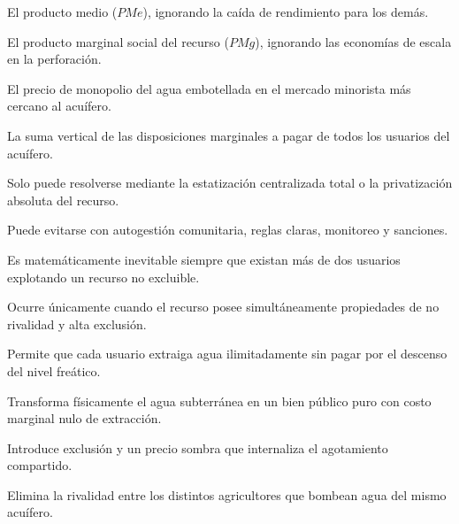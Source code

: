 \begin{opts}
    \item El producto medio ($PMe$), ignorando la caída de rendimiento para los demás.
    \item El producto marginal social del recurso ($PMg$), ignorando las economías de escala en la perforación.
    \item El precio de monopolio del agua embotellada en el mercado minorista más cercano al acuífero.
    \item La suma vertical de las disposiciones marginales a pagar de todos los usuarios del acuífero.
\end{opts}

\begin{opts}
    \item Solo puede resolverse mediante la estatización centralizada total o la privatización absoluta del recurso.
    \item Puede evitarse con autogestión comunitaria, reglas claras, monitoreo y sanciones.
    \item Es matemáticamente inevitable siempre que existan más de dos usuarios explotando un recurso no excluible.
    \item Ocurre únicamente cuando el recurso posee simultáneamente propiedades de no rivalidad y alta exclusión.
\end{opts}

\begin{opts}
    \item Permite que cada usuario extraiga agua ilimitadamente sin pagar por el descenso del nivel freático.
    \item Transforma físicamente el agua subterránea en un bien público puro con costo marginal nulo de extracción.
    \item Introduce exclusión y un precio sombra que internaliza el agotamiento compartido.
    \item Elimina la rivalidad entre los distintos agricultores que bombean agua del mismo acuífero.
\end{opts}

